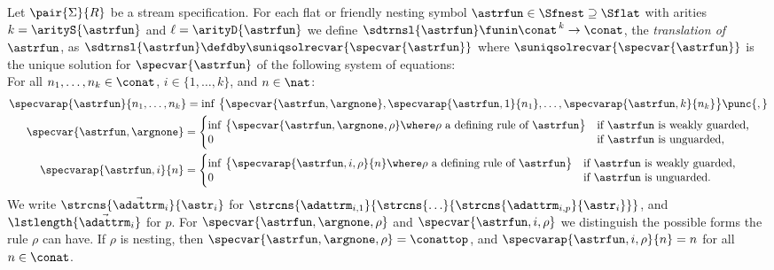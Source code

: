 \begin{definition}\normalfont\label{def:transl:nnSFS}\label{def:transl:frSFS}
  Let $\pair{\Sigma}{R}$ be a stream specification.
  For each flat or friendly nesting symbol
  $\astrfun \in \Sfnest \supseteq \Sflat$ with 
  arities $k = \arityS{\astrfun}$ and $\ell = \arityD{\astrfun}$
  we define $\sdtrnsl{\astrfun}\funin\conat^{\,k}\to\conat$, 
  the \emph{translation of\/ $\astrfun$}, as 
  $\sdtrnsl{\astrfun} \defdby \suniqsolrecvar{\specvar{\astrfun}}$
  where $\suniqsolrecvar{\specvar{\astrfun}}$ is the unique solution  
  for $\specvar{\astrfun}$ of the following system of equations:\\
  For all $n_1,\ldots,n_k\in\conat$, $i \in \{1,\ldots,k\}$, and $n\in\nat$:
  \begin{gather*}
    \specvarap{\astrfun}{n_1,\ldots,n_k}
    = \inf\, \big\{
        \specvar{\astrfun,\argnone},
        \specvarap{\astrfun,1}{n_1},
        \ldots,
        \specvarap{\astrfun,k}{n_k}
      \big\}
    \punc{,}
    \\
    \specvar{\astrfun,\argnone}
    = \begin{cases}
        \inf\,
          \big\{
            \specvar{\astrfun,\argnone,\rho}
            \where \text{$\rho$ a defining rule of $\astrfun$}
          \big\}
        & \text{if $\astrfun$ is weakly guarded,} \\[-0.4ex]
        0 & \text{if $\astrfun$ is unguarded,}
      \end{cases}
    \\
    \specvarap{\astrfun,i}{n}
    = \begin{cases}
        \inf\,
          \big\{
            \specvarap{\astrfun,i,\rho}{n}
            \where \text{$\rho$ a defining rule of $\astrfun$}
          \big\}
        & \text{if $\astrfun$ is weakly guarded,} \\[-0.4ex]
        0 & \text{if $\astrfun$ is unguarded.}
      \end{cases}
  \end{gather*}
  We write $\strcns{\vec{\adattrm}_i}{\astr_i}$ for 
  $\strcns{\adattrm_{i,1}}{\strcns{\ldots}{\strcns{\adattrm_{i,p}}{\astr_i}}}$,
  and $\lstlength{\vec{\adattrm}_i}$ for $p$.
  For $\specvar{\astrfun,\argnone,\rho}$ and $\specvar{\astrfun,i,\rho}$ 
  we distinguish the possible forms the rule $\rho$ can have.
  If $\rho$ is nesting, then
  $\specvar{\astrfun,\argnone,\rho} = \conattop$,
  and 
  $\specvarap{\astrfun,i,\rho}{n} = n$ for all $n \in \conat$.

\end{definition}
